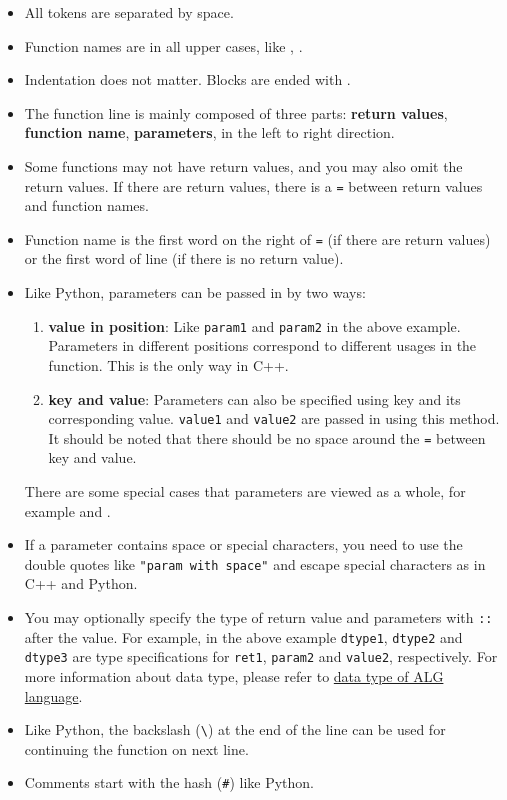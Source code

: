 \begin{itemize}
  \item All tokens are separated by space.
  \item Function names are in all upper cases, like , .
  \item Indentation does not matter. Blocks are ended with .
  \item The function line is mainly composed of three parts:
  \textbf{return values}, \textbf{function name}, \textbf{parameters},
  in the left to right direction.
  \item Some functions may not have return values, and you may also omit the return values.
  If there are return values, there is a \texttt{=} between return values and function names.
  \item Function name is the first word on the right of \texttt{=} (if there are return values)
  or the first word of line (if there is no return value).
  \item Like Python, parameters can be passed in by two ways:
  \begin{enumerate}
    \item \textbf{value in position}: Like \texttt{param1} and \texttt{param2} in the above example.
    Parameters in different positions correspond to different usages in the function.
    This is the only way in C++.
    \item \textbf{key and value}: Parameters can also be specified using key and its
    corresponding value. \texttt{value1} and \texttt{value2} are passed in using this method.
    It should be noted that there should be no space around the \texttt{=} between key and value.
  \end{enumerate}
  There are some special cases that parameters are viewed as a whole,
  for example  and .
  \item If a parameter contains space or special characters, you need to use the
  double quotes like \texttt{"param with space"} and escape special characters as in
  C++ and Python.
  \item You may optionally specify the type of return value and parameters with \texttt{::}
  after the value. For example, in the above example \texttt{dtype1}, \texttt{dtype2} and \texttt{dtype3}
  are type specifications for \texttt{ret1}, \texttt{param2} and \texttt{value2}, respectively.
  For more information about data type, please refer to \hyperref[d:sec:data_type]{data type of ALG language}.
  \item Like Python, the backslash (\texttt{\textbackslash}\indextt{\textbackslash}) at the end of the line can be used for continuing
  the function on next line.
  \item Comments start with the hash (\texttt{\#}\indextt{\#}) like Python.
\end{itemize}

